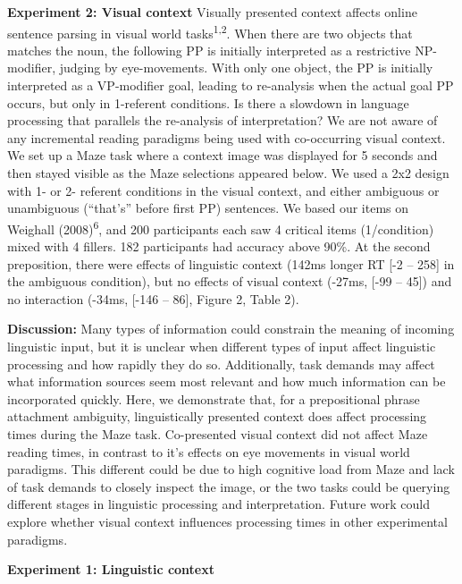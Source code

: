 \documentclass[11pt,a4paper]{article}
\begin{document}
\noindent\textbf{Experiment 2: Visual context} Visually presented context affects online sentence parsing in visual world tasks\textsuperscript{1,2}. When there are two objects that matches the noun, the following PP is initially interpreted as a restrictive NP-modifier, judging by eye-movements. With only one object, the PP is initially interpreted as a VP-modifier goal, leading to re-analysis when the actual goal PP occurs, but only in 1-referent conditions. Is there a slowdown in language processing that parallels the re-analysis of interpretation? We are not aware of any incremental reading paradigms being used with co-occurring visual context. We set up a Maze task where a context image was displayed for 5 seconds and then stayed visible as the Maze selections appeared below. We used a 2x2 design with 1- or 2- referent conditions in the visual context, and either ambiguous or unambiguous (``that's'' before first PP) sentences. We based our items on Weighall (2008)\textsuperscript{6}, and 200 participants each saw 4 critical items (1/condition) mixed with 4 fillers. 182 participants had accuracy above 90\%. At the second preposition, there were effects of linguistic context (142ms longer RT  [-2 -- 258] in the ambiguous condition), but no effects of visual context (-27ms, [-99 -- 45]) and no interaction (-34ms, [-146 -- 86], Figure 2, Table 2). 

\noindent\textbf{Discussion:} Many types of information could constrain the meaning of incoming linguistic input, but it is unclear when different types of input affect linguistic processing and how rapidly they do so. Additionally, task demands may affect what information sources seem most relevant and how much information can be incorporated quickly. Here, we demonstrate that, for a prepositional phrase attachment ambiguity, linguistically presented context does affect processing times during the Maze task. Co-presented visual context did not affect Maze reading times, in contrast to it's effects on eye movements in visual world paradigms. This different could be due to high cognitive load from Maze and lack of task demands to closely inspect the image, or the two tasks could be querying different stages in linguistic processing and interpretation. Future work could explore whether visual context influences processing times in other experimental paradigms. 



\newpage


\begin{center}\textbf{Experiment 1: Linguistic context}\end{center}
\end{document}
